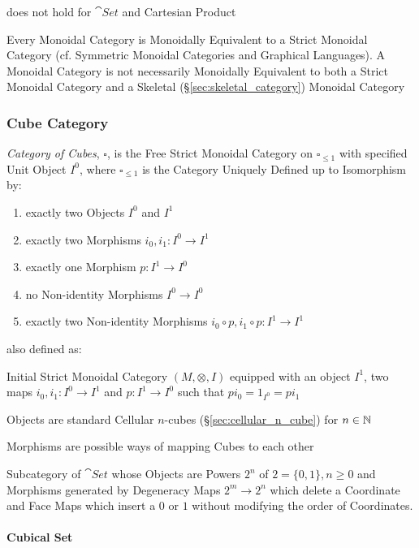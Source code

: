 does not hold for $\cat{Set}$ and Cartesian Product

Every Monoidal Category is Monoidally Equivalent to a Strict Monoidal
Category (cf. Symmetric Monoidal Categories and Graphical Languages).
A Monoidal Category is not necessarily Monoidally Equivalent to both a
Strict Monoidal Category and a Skeletal
(\S\ref{sec:skeletal_category}) Monoidal Category



\subsubsection{Cube Category}\label{sec:cube_category}

\emph{Category of Cubes}, $\square$, is the Free Strict Monoidal
Category on $\square_{\leq 1}$ with specified Unit Object $I^0$, where
$\square_{\leq 1}$ is the Category Uniquely Defined up to Isomorphism
by:
\begin{enumerate}
  \item exactly two Objects $I^0$ and $I^1$
  \item exactly two Morphisms $i_0, i_1 : I^0 \rightarrow I^1$
  \item exactly one Morphism $p : I^1 \rightarrow I^0$
  \item no Non-identity Morphisms $I^0 \rightarrow I^0$
  \item exactly two Non-identity Morphisms
    $i_0 \circ p, i_1 \circ p : I^1 \rightarrow I^1$
\end{enumerate}

also defined as:

Initial Strict Monoidal Category $(M, \otimes, I)$ equipped with an
object $I^1$, two maps $i_0, i_1 : I^0 \rightarrow I^1$ and $p : I^1
\rightarrow I^0$ such that $pi_0 = 1_{I^0} = pi_1$

Objects are standard Cellular $n$-cubes (\S\ref{sec:cellular_n_cube})
for $n \in \mathbb{N}$

Morphisms are possible ways of mapping Cubes to each other

Subcategory of $\cat{Set}$ whose Objects are Powers $2^n$ of $2 =
\{0,1\}, n \geq 0$ and Morphisms generated by Degeneracy Maps $2^m
\rightarrow 2^n$ which delete a Coordinate and Face Maps which insert
a $0$ or $1$ without modifying the order of Coordinates. %



\paragraph{Cubical Set}\label{sec:cubical_set}\hfill

